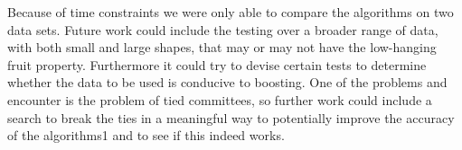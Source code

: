 \par Because of time constraints we were only able to compare the algorithms on two data sets. Future work could include the testing over a broader range of data, with both small and large shapes, that may or may not have the low-hanging fruit property. Furthermore it could try to devise certain tests to determine whether the data to be used is conducive to boosting. One of the problems \squintB and \NHB encounter is the problem of tied committees, so further work could include a search to break the ties in a meaningful way to potentially improve the accuracy of the algorithms1 and to see if this indeed works. 
